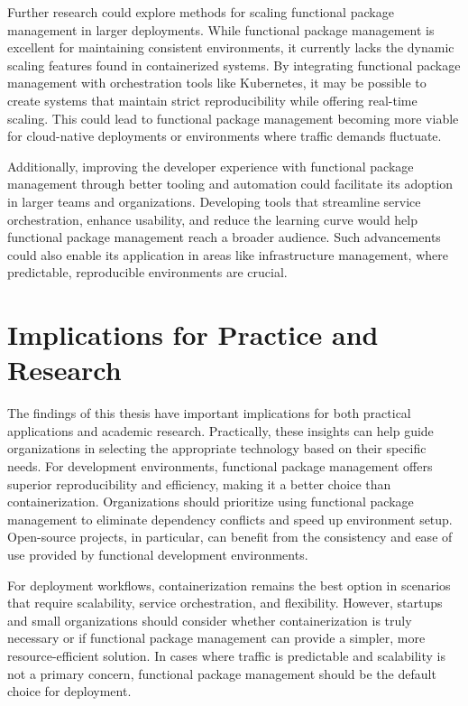 Further research could explore methods for scaling functional package management in larger 
deployments. While functional package management is excellent for maintaining consistent 
environments, it currently lacks the dynamic scaling features found in containerized systems. 
By integrating functional package management with orchestration tools like Kubernetes, 
it may be possible to create systems that maintain strict reproducibility while offering 
real-time scaling. This could lead to functional package management becoming more viable 
for cloud-native deployments or environments where traffic demands fluctuate.

Additionally, improving the developer experience with functional package management through 
better tooling and automation could facilitate its adoption in larger teams and organizations. 
Developing tools that streamline service orchestration, enhance usability, and reduce the 
learning curve would help functional package management reach a broader audience. Such 
advancements could also enable its application in areas like infrastructure management, 
where predictable, reproducible environments are crucial.

\section{Implications for Practice and Research}
The findings of this thesis have important implications for both practical applications 
and academic research. Practically, these insights can help guide organizations in selecting 
the appropriate technology based on their specific needs. For development environments, 
functional package management offers superior reproducibility and efficiency, making it 
a better choice than containerization. Organizations should prioritize using functional 
package management to eliminate dependency conflicts and speed up environment setup. Open-source 
projects, in particular, can benefit from the consistency and ease of use provided by 
functional development environments.

For deployment workflows, containerization remains the best option in scenarios that require 
scalability, service orchestration, and flexibility. However, startups and small organizations 
should consider whether containerization is truly necessary or if functional package management 
can provide a simpler, more resource-efficient solution. In cases where traffic is predictable 
and scalability is not a primary concern, functional package management should be the default 
choice for deployment.

